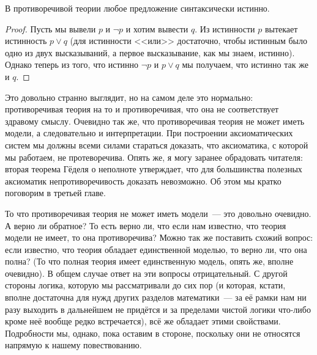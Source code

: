 \begin{thm}
В противоречивой теории любое предложение синтаксически истинно.
\end{thm}
\begin{proof}
Пусть мы вывели $p$ и $\neg p$ и хотим вывести $q$. Из истинности $p$ вытекает истинность $p\lor q$ (для истинности <<или>> достаточно, чтобы истинным было одно из двух высказываний, а первое высказывание, как мы знаем, истинно). Однако теперь из того, что истинно $\neg p$ и $p\lor q$ мы получаем, что истинно так же и $q$.
\end{proof}

Это довольно странно выглядит, но на самом деле это нормально: противоречивая теория на то и противоречивая, что она не соответствует здравому смыслу. Очевидно так же, что противоречивая теория не может иметь модели, а следовательно и интерпретации. При построении аксиоматических систем мы должны всеми силами стараться доказать, что аксиоматика, с которой мы работаем, не протеворечива. Опять же, я могу заранее обрадовать читателя: вторая теорема Гёделя о неполноте утверждает, что для большинства полезных аксиоматик непротиворечивость доказать невозможно. Об этом мы кратко поговорим в третьей главе.

То что противоречивая теория не может иметь модели~--- это довольно очевидно. А верно ли обратное? То есть верно ли, что если нам известно, что теория модели не имеет, то она противоречива? Можно так же поставить схожий вопрос: если известно, что теория обладает единственной моделью, то верно ли, что она полна? (То что полная теория имеет единственную модель, опять же, вполне очевидно). В общем случае ответ на эти вопросы отрицательный. С другой стороны логика, которую мы рассматривали до сих пор (и которая, кстати, вполне достаточна для нужд других разделов математики~--- за её рамки нам ни разу выходить в дальнейшем не придётся и за пределами чистой логики что-либо кроме неё вообще редко встречается), всё же обладает этими свойствами. Подробности мы, однако, пока оставим в стороне, поскольку они не относятся напрямую к нашему повествованию.
